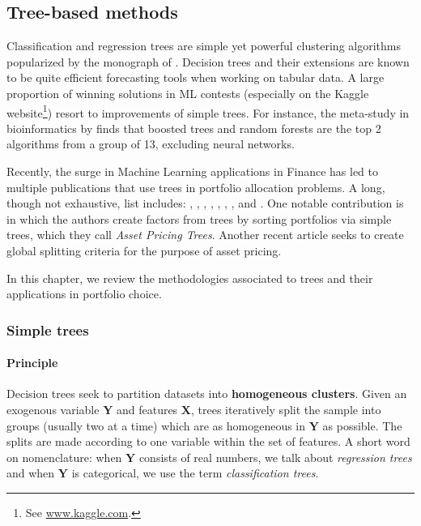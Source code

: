 \subsection{Tree-based methods}

Classification and regression trees are simple yet powerful clustering algorithms popularized by the monograph of \cite{breiman1984classification}. Decision trees and their extensions are known to be quite efficient forecasting tools when working on tabular data. A large proportion of winning solutions in ML contests (especially on the Kaggle website\footnote{See \href{http://www.kaggle.com}{www.kaggle.com}.}) resort to improvements of simple trees. For instance, the meta-study in bioinformatics by \cite{olson2018data} finds that boosted trees and random forests are the top 2 algorithms from a group of 13, excluding neural networks.

Recently, the surge in Machine Learning applications in Finance has led to multiple publications that use trees in portfolio allocation problems. A long, though not exhaustive, list includes: \cite{ballings2015evaluating}, \cite{patel2015predicting}, \cite{patel2015bpredicting}, \cite{moritz2016tree}, \cite{krauss2017deep}, \cite{gu2018empirical}, \cite{guida2019big}, \cite{coqueret2019training} and \cite{simonian2019machine}. One notable contribution is \cite{bryzgalova2019forest} in which the authors create factors from trees by sorting portfolios via simple trees, which they call \textit{Asset Pricing Trees}. Another recent article \citep{he2021panel} seeks to create global splitting criteria for the purpose of asset pricing.

In this chapter, we review the methodologies associated to trees and their applications in portfolio choice.

\subsubsection{Simple trees}

\paragraph{Principle}

Decision trees seek to partition datasets into \textbf{homogeneous clusters}. Given an exogenous variable $\mathbf{Y}$ and features $\mathbf{X}$, trees iteratively split the sample into groups (usually two at a time) which are as homogeneous in $\mathbf{Y}$ as possible. The splits are made according to one variable within the set of features. A short word on nomenclature: when $\mathbf{Y}$ consists of real numbers, we talk about \textit{regression trees} and when $\mathbf{Y}$ is categorical, we use the term \textit{classification trees}.

